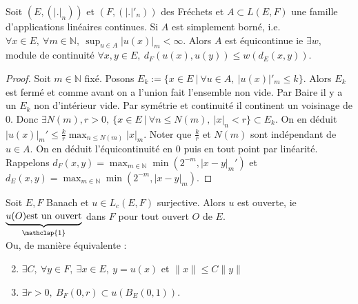 \begin{theoreme}
    Soit $(E,(|.|_n))$ et $(F,(|.|'_n))$ des Fréchets et $A\subset L(E,F)$ une famille d'applications linéaires continues. Si $A$ est simplement borné, i.e. $\forall x\in E,\ \forall m\in \mathbb{N} ,\ \sup_{u\in A}|u(x)|_m<\infty . $ Alors $A$ est équicontinue ie $\exists w,$ module de continuité $\forall x,y\in E,\ d_F(u(x),u(y))\le w(d_E(x,y)). $
\end{theoreme}
\begin{proof}
    Soit $m\in \mathbb{N} $ fixé. Posons $E_k:=\{x\in E\ |\ \forall u\in A,\ |u(x)|'_m\le k \}  $. Alors $E_k$ est fermé et comme avant on a l'union fait l'ensemble non vide. Par Baire il y a un $E_k$ non d'intérieur vide. Par symétrie et continuité il continent un voisinage de 0. Donc $\exists N(m), r>0,\ \{x\in E\ |\ \forall n\le N(m),\ |x|_n<r \} \subset E_k.$ On en déduit $|u(x)|_m'\le \frac{k}{r}\max_{n\le N(m)}|x|_m.$ Noter que $\frac{k}{r}$ et $N(m)$ sont indépendant de $u\in A.$ On en déduit l'équicontinuité en 0 puis en tout point par linéarité. Rappelons $d_F(x,y)=\max_{m\in \mathbb{N} }\min(2^{-m},|x-y|_m')$ et $d_E(x,y)=\max_{m\in \mathbb{N} }\min(2^{-m},|x-y|_m)$.
\end{proof}
\begin{theoreme}
    Soit $E,F$ Banach et $u\in L_c(E,F)$ surjective. Alors $u$ est ouverte, ie $\underbrace{u(O) \text{est un ouvert}}_{\mathclap{\text{1}}}$ dans $F$ pour tout ouvert $O$ de $E$.\\
    Ou, de manière équivalente :
    \begin{enumerate} \setcounter{enumi}{1}
        \item $\exists C,\ \forall y\in F,\ \exists x\in E,\ y=u(x) $ et $\|x\|\le C\|y\|$
        \item $\exists r>0,\ B_F(0,r)\subset u(B_E(0,1))$.
    \end{enumerate}
\end{theoreme}
